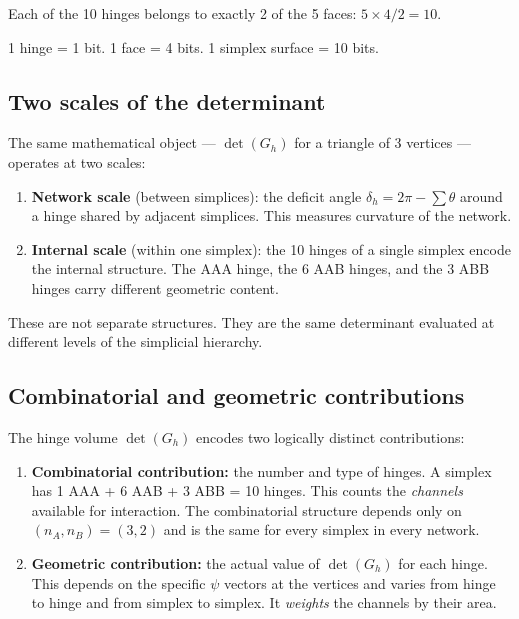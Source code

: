 \begin{theorem}
\label{thm:hinge_face}
Each of the 10 hinges belongs to exactly 2 of the 5 faces: $5 \times 4 / 2 = 10$.
\end{theorem}

\begin{corollary}
1 hinge = 1 bit. 1 face = 4 bits. 1 simplex surface = 10 bits.
\end{corollary}

\subsection{Two scales of the determinant}

The same mathematical object --- $\det(G_h)$ for a triangle of 3 vertices --- operates at two scales:

\begin{enumerate}
\item \textbf{Network scale} (between simplices): the deficit angle $\delta_h = 2\pi - \sum\theta$ around a hinge shared by adjacent simplices. This measures curvature of the network.
\item \textbf{Internal scale} (within one simplex): the 10 hinges of a single simplex encode the internal structure. The AAA hinge, the 6 AAB hinges, and the 3 ABB hinges carry different geometric content.
\end{enumerate}

These are not separate structures. They are the same determinant evaluated at different levels of the simplicial hierarchy.

\subsection{Combinatorial and geometric contributions}
\label{sec:comb_vs_geom}

The hinge volume $\det(G_h)$ encodes two logically distinct contributions:

\begin{enumerate}
\item \textbf{Combinatorial contribution:} the number and type of hinges. A simplex has 1 AAA + 6 AAB + 3 ABB = 10 hinges. This counts the \emph{channels} available for interaction. The combinatorial structure depends only on $(n_A, n_B) = (3, 2)$ and is the same for every simplex in every network.

\item \textbf{Geometric contribution:} the actual value of $\det(G_h)$ for each hinge. This depends on the specific $\psi$ vectors at the vertices and varies from hinge to hinge and from simplex to simplex. It \emph{weights} the channels by their area.
\end{enumerate}

